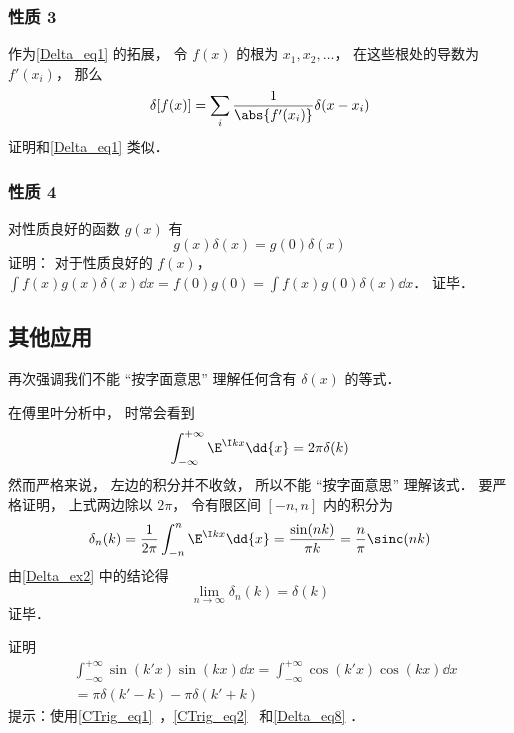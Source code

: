 \subsubsection{性质 3}
作为\autoref{Delta_eq1} 的拓展， 令 $f(x)$ 的根为 $x_1, x_2, \dots$， 在这些根处的导数为 $f'(x_i)$， 那么
\begin{equation}\label{Delta_eq12}
\delta[f(x)] = \sum_i \frac{1}{\abs{f'(x_i)}} \delta(x - x_i)
\end{equation}
证明和\autoref{Delta_eq1} 类似．

\subsubsection{性质 4}
对性质良好的函数 $g(x)$ 有
\begin{equation}
g(x)\delta(x) = g(0)\delta(x)
\end{equation}
证明： 对于性质良好的 $f(x)$， $\int f(x) g(x)\delta(x) \dd{x} = f(0)g(0) = \int f(x)g(0)\delta(x) \dd{x}$． 证毕．

\subsection{其他应用}
再次强调我们不能 “按字面意思” 理解任何含有 $\delta(x)$ 的等式．
\begin{example}{}\label{Delta_ex1}
在傅里叶分析中， 时常会看到
\begin{equation}\label{Delta_eq8}
\int_{-\infty}^{+\infty} \E^{\I kx}\dd{x} = 2\pi \delta(k)
\end{equation}
然而严格来说， 左边的积分并不收敛， 所以不能 “按字面意思” 理解该式． 要严格证明， 上式两边除以 $2\pi$， 令有限区间 $[-n,n]$ 内的积分为
\begin{equation}
\delta_n(k) = \frac{1}{2\pi}\int_{-n}^{n} \E^{\I kx}\dd{x} = \frac{\sin(n k)}{\pi k} = \frac{n}{\pi} \sinc(n k)
\end{equation}
由\autoref{Delta_ex2} 中的结论得
\begin{equation}
\lim_{n\to\infty} \delta_n(k) = \delta(k)
\end{equation}
证毕．
\end{example}

\begin{exercise}{}\label{Delta_exe3}
证明
\begin{equation}\label{Delta_eq9}
\begin{aligned}%
&\int_{-\infty}^{+\infty} \sin(k'x) \sin(kx) \dd{x} = \int_{-\infty}^{+\infty} \cos(k'x) \cos(kx) \dd{x}\\
&= \pi\delta(k' - k) - \pi\delta(k' + k)
\end{aligned}
\end{equation}
提示：使用\autoref{CTrig_eq1}~，\autoref{CTrig_eq2}~ 和\autoref{Delta_eq8} ．
\end{exercise}

